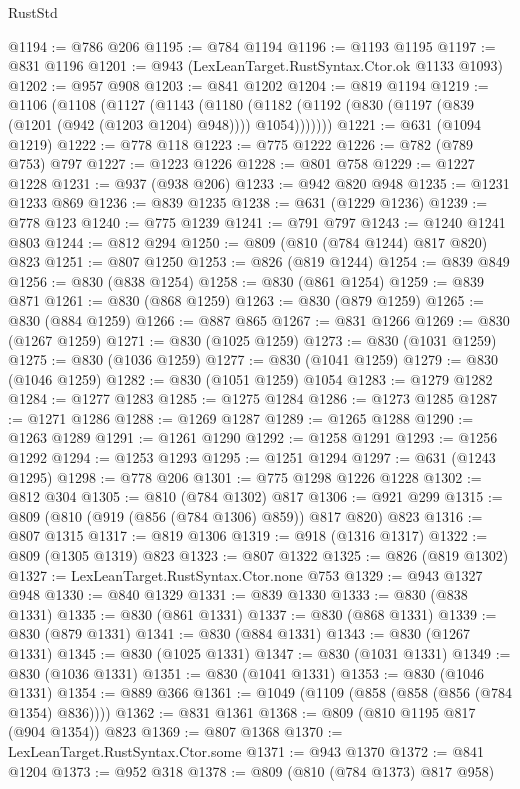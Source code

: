 \begin{lexlean}{RustStd}
\begin{coremodule}
@1194 := @786 @206
@1195 := @784 @1194
@1196 := @1193 @1195
@1197 := @831 @1196
@1201 := @943 (LexLeanTarget.RustSyntax.Ctor.ok @1133 @1093)
@1202 := @957 @908
@1203 := @841 @1202
@1204 := @819 @1194
@1219 := @1106
    (@1108
      (@1127
        (@1143
          (@1180 (@1182 (@1192 (@830 (@1197 (@839 (@1201 (@942 (@1203 @1204) @948)))) @1054)))))))
@1221 := @631 (@1094 @1219)
@1222 := @778 @118
@1223 := @775 @1222
@1226 := @782 (@789 @753) @797
@1227 := @1223 @1226
@1228 := @801 @758
@1229 := @1227 @1228
@1231 := @937 (@938 @206)
@1233 := @942 @820 @948
@1235 := @1231 @1233 @869
@1236 := @839 @1235
@1238 := @631 (@1229 @1236)
@1239 := @778 @123
@1240 := @775 @1239
@1241 := @791 @797
@1243 := @1240 @1241 @803
@1244 := @812 @294
@1250 := @809 (@810 (@784 @1244) @817 @820) @823
@1251 := @807 @1250
@1253 := @826 (@819 @1244)
@1254 := @839 @849
@1256 := @830 (@838 @1254)
@1258 := @830 (@861 @1254)
@1259 := @839 @871
@1261 := @830 (@868 @1259)
@1263 := @830 (@879 @1259)
@1265 := @830 (@884 @1259)
@1266 := @887 @865
@1267 := @831 @1266
@1269 := @830 (@1267 @1259)
@1271 := @830 (@1025 @1259)
@1273 := @830 (@1031 @1259)
@1275 := @830 (@1036 @1259)
@1277 := @830 (@1041 @1259)
@1279 := @830 (@1046 @1259)
@1282 := @830 (@1051 @1259) @1054
@1283 := @1279 @1282
@1284 := @1277 @1283
@1285 := @1275 @1284
@1286 := @1273 @1285
@1287 := @1271 @1286
@1288 := @1269 @1287
@1289 := @1265 @1288
@1290 := @1263 @1289
@1291 := @1261 @1290
@1292 := @1258 @1291
@1293 := @1256 @1292
@1294 := @1253 @1293
@1295 := @1251 @1294
@1297 := @631 (@1243 @1295)
@1298 := @778 @206
@1301 := @775 @1298 @1226 @1228
@1302 := @812 @304
@1305 := @810 (@784 @1302) @817
@1306 := @921 @299
@1315 := @809 (@810 (@919 (@856 (@784 @1306) @859)) @817 @820) @823
@1316 := @807 @1315
@1317 := @819 @1306
@1319 := @918 (@1316 @1317)
@1322 := @809 (@1305 @1319) @823
@1323 := @807 @1322
@1325 := @826 (@819 @1302)
@1327 := LexLeanTarget.RustSyntax.Ctor.none @753
@1329 := @943 @1327 @948
@1330 := @840 @1329
@1331 := @839 @1330
@1333 := @830 (@838 @1331)
@1335 := @830 (@861 @1331)
@1337 := @830 (@868 @1331)
@1339 := @830 (@879 @1331)
@1341 := @830 (@884 @1331)
@1343 := @830 (@1267 @1331)
@1345 := @830 (@1025 @1331)
@1347 := @830 (@1031 @1331)
@1349 := @830 (@1036 @1331)
@1351 := @830 (@1041 @1331)
@1353 := @830 (@1046 @1331)
@1354 := @889 @366
@1361 := @1049 (@1109 (@858 (@858 (@856 (@784 @1354) @836))))
@1362 := @831 @1361
@1368 := @809 (@810 @1195 @817 (@904 @1354)) @823
@1369 := @807 @1368
@1370 := LexLeanTarget.RustSyntax.Ctor.some
@1371 := @943 @1370
@1372 := @841 @1204
@1373 := @952 @318
@1378 := @809 (@810 (@784 @1373) @817 @958)

\end{coremodule}
\end{lexlean}

